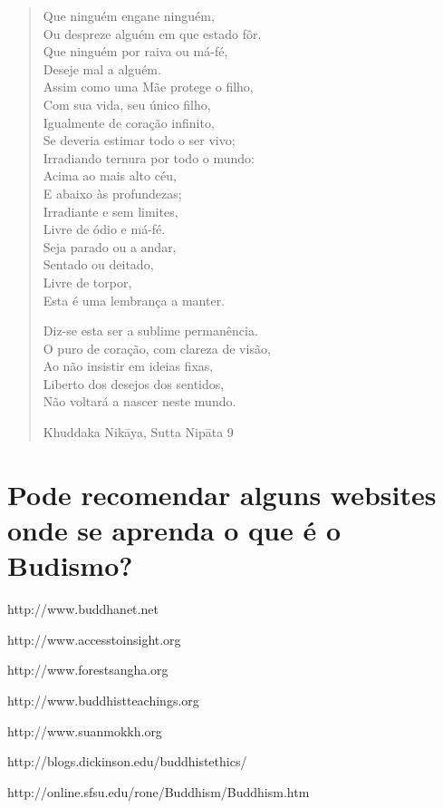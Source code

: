 \begin{verse}
Que ninguém engane ninguém,\\
Ou despreze alguém em que estado fôr.\\
Que ninguém por raiva ou má-fé,\\
Deseje mal a alguém.\\
Assim como uma Mãe protege o filho,\\
Com sua vida, seu único filho,\\
Igualmente de coração infinito,\\
Se deveria estimar todo o ser vivo;\\
Irradiando ternura por todo o mundo:\\
Acima ao mais alto céu,\\
E abaixo às profundezas;\\
Irradiante e sem limites,\\
Livre de ódio e má-fé.\\
Seja parado ou a andar,\\
Sentado ou deitado,\\
Livre de torpor,\\
Esta é uma lembrança a manter.

Diz-se esta ser a sublime permanência.\\
O puro de coração, com clareza de visão,\\
Ao não insistir em ideias fixas,\\
Liberto dos desejos dos sentidos,\\
Não voltará a nascer neste mundo.

{\raggedleft
Khuddaka Nikāya, Sutta Nipāta 9
\par}

\end{verse}

\section{Pode recomendar alguns websites onde se aprenda o que é o Budismo?}

http://www.buddhanet.net

http://www.accesstoinsight.org

http://www.forestsangha.org

http://www.buddhistteachings.org

http://www.suanmokkh.org

http://blogs.dickinson.edu/buddhistethics/

http://online.sfsu.edu/rone/Buddhism/Buddhism.htm


